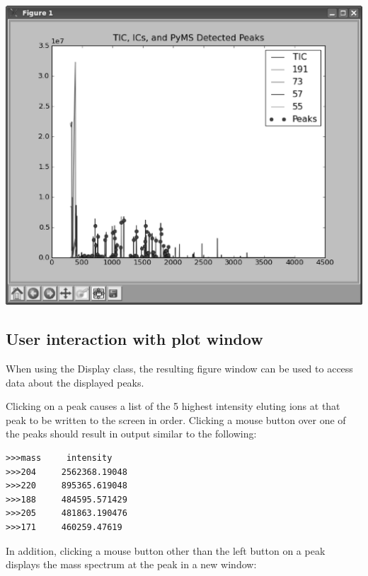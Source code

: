 \begin{center}
\includegraphics[scale=0.33]{graphics/test-71-ICs.eps}
\end{center}

\subsection{User interaction with plot window}

When using the Display class, the resulting figure window can be used to
access data about the displayed peaks.

Clicking on a peak causes a list of the 5 highest intensity eluting ions at that
peak to be written to the screen in order.
Clicking a mouse button over one of the 
peaks should result in output similar to the following:

\begin{verbatim}
>>>mass     intensity
>>>204     2562368.19048
>>>220     895365.619048
>>>188     484595.571429
>>>205     481863.190476
>>>171     460259.47619
\end{verbatim}

In addition, clicking a mouse button other than the left button on a peak displays the 
mass spectrum at the peak in a new window:

